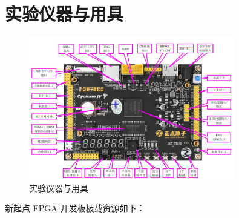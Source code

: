\documentclass[UTF8]{article}
\theoremstyle{MyLineTheoremStyle} %
\theoremstyle{MyBlockTheoremStyle} %
\theoremstyle{MySubsubsectionStyle} %
\begin{document}
\setcounter{tocdepth}{2}  %
\noindent\tableofcontents\thispagestyle{fancy}   %


\newpage
{}








\section{实验仪器与用具}

\begin{figure}[H]
    \centering
    \includegraphics[width=0.8\textwidth]{FPGA.png}
    \caption{实验仪器与用具}
    \label{fig:实验仪器与用具}
\end{figure}

新起点 FPGA 开发板板载资源如下：
\end{document}
